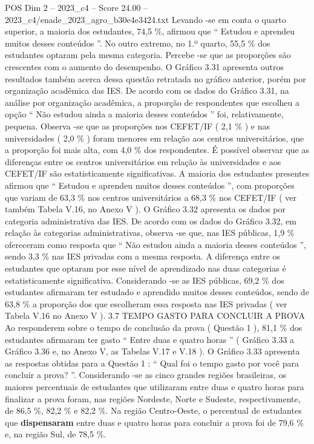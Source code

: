 \begin{textsample}{POS Dim 2 – 2023\_c4 – Score 24.00 – 2023\_c4/enade\_2023\_agro\_b30e4e3424.txt}
Levando -se em conta o quarto superior, a maioria dos estudantes, 74,5 \%, afirmou que “ Estudou e aprendeu muitos desses conteúdos ”.
No outro extremo, no 1.º quarto, 55,5 \% dos estudantes optaram pela mesma categoria.
Percebe -se que as proporções são crescentes com o aumento do desempenho.
O Gráfico 3.31 apresenta outros resultados também acerca dessa questão retratada no gráfico anterior, porém por organização acadêmica das IES.
De acordo com os dados do Gráfico 3.31, na análise por organização acadêmica, a proporção de respondentes que escolheu a opção “ Não estudou ainda a maioria desses conteúdos ” foi, relativamente, pequena.
Observa -se que as proporções nos CEFET/IF ( 2,1 \% ) e nas universidades ( 2,0 \% ) foram menores em relação aos centros universitários, que a proporção foi mais alta, com 4,0 \% dos respondentes.
É possível observar que as diferenças entre os centros universitários em relação às universidades e aos CEFET/IF são estatisticamente significativas.
A maioria dos estudantes presentes afirmou que “ Estudou e aprendeu muitos desses conteúdos ”, com proporções que variam de 63,3 \% nos centros universitários a 68,3 \% nos CEFET/IF ( ver também Tabela V.16, no Anexo V ).
O Gráfico 3.32 apresenta os dados por categoria administrativa das IES.
De acordo com os dados do Gráfico 3.32, em relação às categorias administrativas, observa -se que, nas IES públicas, 1,9 \% ofereceram como resposta que “ Não estudou ainda a maioria desses conteúdos ”, sendo 3,3 \% nas IES privadas com a mesma resposta.
A diferença entre os estudantes que optaram por esse nível de aprendizado nas duas categorias é estatisticamente significativa.
Considerando -se as IES públicas, 69,2 \% dos estudantes afirmaram ter estudado e aprendido muitos desses conteúdos, sendo de 63,8 \% a proporção dos que escolheram essa resposta nas IES privadas ( ver Tabela V.16 no Anexo V ). 3.7 TEMPO GASTO PARA CONCLUIR A PROVA Ao responderem sobre o tempo de conclusão da prova ( Questão 1 ), 81,1 \% dos estudantes afirmaram ter gasto “ Entre duas e quatro horas ” ( Gráfico 3.33 a Gráfico 3.36 e, no Anexo V, as Tabelas V.17 e V.18 ).
O Gráfico 3.33 apresenta as respostas obtidas para a Questão 1 : “ Qual foi o tempo gasto por você para concluir a prova? ”.
Considerando -se as cinco grandes regiões brasileiras, os maiores percentuais de estudantes que utilizaram entre duas e quatro horas para finalizar a prova foram, nas regiões Nordeste, Norte e Sudeste, respectivamente, de 86,5 \%, 82,2 \% e 82,2 \%.
Na região Centro-Oeste, o percentual de estudantes que \textbf{dispensaram} entre duas e quatro horas para concluir a prova foi de 79,6 \% e, na região Sul, de 78,5 \%.

\end{textsample}

